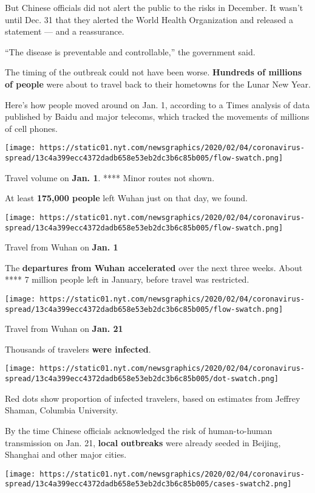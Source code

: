 But Chinese officials did not alert the public to the risks in December.
It wasn't until Dec. 31 that they alerted the World Health Organization
and released a statement --- and a reassurance.

``The disease is preventable and controllable,'' the government said.

The timing of the outbreak could not have been worse. \textbf{Hundreds
of millions of people} were about to travel back to their hometowns for
the Lunar New Year.

Here's how people moved around on Jan. 1, according to a Times analysis
of data published by Baidu and major telecoms, which tracked the
movements of millions of cell phones.

\texttt{[image: https://static01.nyt.com/newsgraphics/2020/02/04/coronavirus-spread/13c4a399ecc4372dadb658e53eb2dc3b6c85b005/flow-swatch.png]}

Travel volume on \textbf{Jan. 1}. **** Minor routes not shown.

At least \textbf{175,000 people} left Wuhan just on that day, we found.

\texttt{[image: https://static01.nyt.com/newsgraphics/2020/02/04/coronavirus-spread/13c4a399ecc4372dadb658e53eb2dc3b6c85b005/flow-swatch.png]}

Travel from Wuhan on \textbf{Jan. 1}

The \textbf{departures from Wuhan accelerated} over the next three
weeks. About **** 7 million people left in January, before travel was
restricted.

\texttt{[image: https://static01.nyt.com/newsgraphics/2020/02/04/coronavirus-spread/13c4a399ecc4372dadb658e53eb2dc3b6c85b005/flow-swatch.png]}

Travel from Wuhan on \textbf{Jan. 21}

Thousands of travelers \textbf{were infected}.

\texttt{[image: https://static01.nyt.com/newsgraphics/2020/02/04/coronavirus-spread/13c4a399ecc4372dadb658e53eb2dc3b6c85b005/dot-swatch.png]}

Red dots show proportion of infected travelers, based on estimates from
Jeffrey Shaman, Columbia University.

By the time Chinese officials acknowledged the risk of human-to-human
transmission on Jan. 21, \textbf{local outbreaks} were already seeded in
Beijing, Shanghai and other major cities.

\texttt{[image: https://static01.nyt.com/newsgraphics/2020/02/04/coronavirus-spread/13c4a399ecc4372dadb658e53eb2dc3b6c85b005/cases-swatch2.png]}

